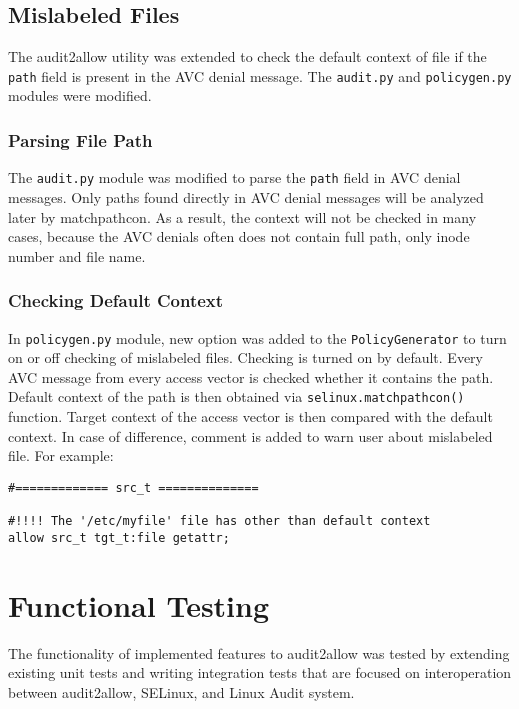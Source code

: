 \section{Mislabeled Files}
The audit2allow utility was extended to check the default context of file if the
\texttt{path} field is present in the AVC denial message. The \texttt{audit.py}
and \texttt{policygen.py} modules were modified.

\subsection{Parsing File Path}
The \texttt{audit.py} module was modified to parse the \texttt{path} field in
AVC denial messages. Only paths found directly in AVC denial messages will be
analyzed later by matchpathcon. As a result, the context will not be checked in
many cases, because the AVC denials often does not contain full path, only inode
number and file name.

\subsection{Checking Default Context}
In \texttt{policygen.py} module, new option was added to the
\texttt{PolicyGenerator} to turn on or off checking of mislabeled files.
Checking is turned on by default. Every AVC message from every access vector is
checked whether it contains the path. Default context of the path is then
obtained via \texttt{selinux.matchpathcon()} function. Target context of the
access vector is then compared with the default context. In case of difference,
comment is added to warn user about mislabeled file. For example:
\begin{lstlisting}
#============= src_t ==============

#!!!! The '/etc/myfile' file has other than default context
allow src_t tgt_t:file getattr;
\end{lstlisting}

\chapter{Functional Testing}
The functionality of implemented features to audit2allow was tested by extending
existing unit tests and writing integration tests that are focused on
interoperation between audit2allow, SELinux, and Linux Audit system.

